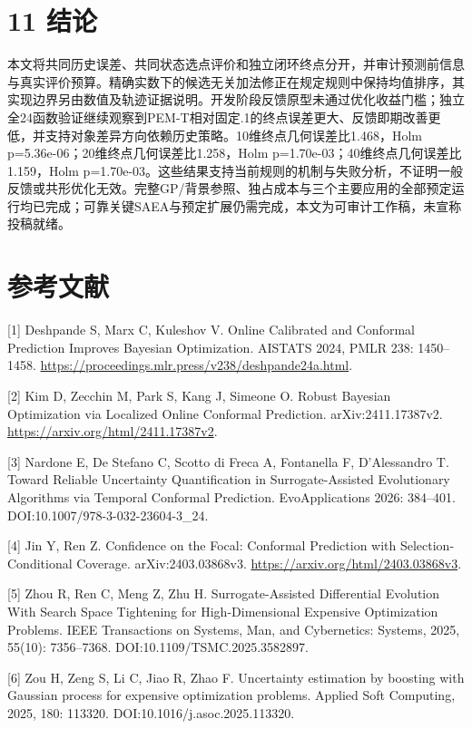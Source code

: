 \documentclass[11pt,a4paper]{article}
\begin{document}
\hypertarget{ux7ed3ux8bba}{%
\section{11 结论}\label{ux7ed3ux8bba}}

本文将共同历史误差、共同状态选点评价和独立闭环终点分开，并审计预测前信息与真实评价预算。精确实数下的候选无关加法修正在规定规则中保持均值排序，其实现边界另由数值及轨迹证据说明。开发阶段反馈原型未通过优化收益门槛；独立全24函数验证继续观察到PEM-T相对固定.1的终点误差更大、反馈即期改善更低，并支持对象差异方向依赖历史策略。10维终点几何误差比1.468，Holm
p=5.36e-06；20维终点几何误差比1.258，Holm
p=1.70e-03；40维终点几何误差比1.159，Holm
p=1.70e-03。这些结果支持当前规则的机制与失败分析，不证明一般反馈或共形优化无效。完整GP/背景参照、独占成本与三个主要应用的全部预定运行均已完成；可靠关键SAEA与预定扩展仍需完成，本文为可审计工作稿，未宣称投稿就绪。

\hypertarget{ux53c2ux8003ux6587ux732e}{%
\section{参考文献}\label{ux53c2ux8003ux6587ux732e}}

{[}1{]} Deshpande S, Marx C, Kuleshov V. Online Calibrated and Conformal
Prediction Improves Bayesian Optimization. AISTATS 2024, PMLR 238:
1450--1458. \url{https://proceedings.mlr.press/v238/deshpande24a.html}.

{[}2{]} Kim D, Zecchin M, Park S, Kang J, Simeone O. Robust Bayesian
Optimization via Localized Online Conformal Prediction.
arXiv:2411.17387v2. \url{https://arxiv.org/html/2411.17387v2}.

{[}3{]} Nardone E, De Stefano C, Scotto di Freca A, Fontanella F,
D'Alessandro T. Toward Reliable Uncertainty Quantification in
Surrogate-Assisted Evolutionary Algorithms via Temporal Conformal
Prediction. EvoApplications 2026: 384--401.
DOI:10.1007/978-3-032-23604-3\_24.

{[}4{]} Jin Y, Ren Z. Confidence on the Focal: Conformal Prediction with
Selection-Conditional Coverage. arXiv:2403.03868v3.
\url{https://arxiv.org/html/2403.03868v3}.

{[}5{]} Zhou R, Ren C, Meng Z, Zhu H. Surrogate-Assisted Differential
Evolution With Search Space Tightening for High-Dimensional Expensive
Optimization Problems. IEEE Transactions on Systems, Man, and
Cybernetics: Systems, 2025, 55(10): 7356--7368.
DOI:10.1109/TSMC.2025.3582897.

{[}6{]} Zou H, Zeng S, Li C, Jiao R, Zhao F. Uncertainty estimation by
boosting with Gaussian process for expensive optimization problems.
Applied Soft Computing, 2025, 180: 113320.
DOI:10.1016/j.asoc.2025.113320.
\end{document}
